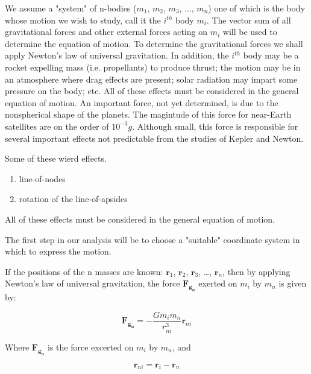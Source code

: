 \documentclass[11pt]{article}
\begin{document}
    We assume a "system" of n-bodies (${m}_{1}$, ${m}_{2}$, ${m}_{3}$, ..., ${m}_{n}$) one of which is the body whose
    motion we wish to study, call it the ${i}^{th}$ body ${m}_{i}$.  The vector sum of all gravitational forces and
    other external forces acting on ${m}_{i}$ will be used to determine the equation of motion.  To determine the
    gravitational forces we shall apply Newton's law of universal gravitation.  In addition, the ${i}^{th}$ body may
    be a rocket expelling mass (i.e. propellants) to produce thrust; the motion may be in an atmosphere where drag
    effects are present; solar radiation may impart some pressure on the body; etc.  All of these effects must be
    considered in the general equation of motion. An important force, not yet determined, is due to the nonspherical
    shape of the planets. The magintude of this force for near-Earth satellites are on the order of ${10}^{-3} g$.
    Although small, this force is responsible for several important effects not predictable from the studies of Kepler
    and Newton.

    Some of these wierd effects.

    \begin{enumerate}[label=\alph*)]
        \item line-of-nodes
        \item rotation of the line-of-apsides
    \end{enumerate}

    All of these effects must be considered in the general equation of motion.

    The first step in our analysis will be to choose a "suitable" coordinate system in which to express the motion.

    If the positions of the n masses are known: $\mathbf{r}_{1}$, $\mathbf{r}_{2}$, $\mathbf{r}_{3}$, \ldots, $\mathbf{r}_{n}$,
    then by applying Newton's law of universal gravitation, the force $\mathbf{{F}_{g_n}}$ exerted on ${m}_{i}$ by
    ${m}_{n}$ is given by:

    \begin{equation}
        \mathbf{{F}_{g_n}} = -\frac{{G} {m}_{i} {m}_{n}}{r_{ni}^{3}} \mathbf{r}_{ni}
        \label{eq:force_on_m_i}
    \end{equation}

    Where $\mathbf{{F}_{g_n}}$ is the force excerted on ${m}_{i}$ by ${m}_{n}$, and

    \begin{equation}
        \mathbf{r}_{ni} = \mathbf{r}_{i} - \mathbf{r}_{n}
        \label{eq:vector_r_ni}
    \end{equation}
\end{document}
